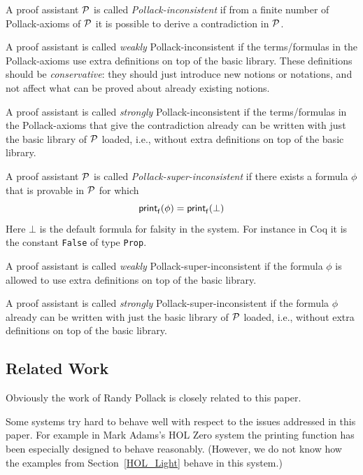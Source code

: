 \documentclass{entcs}
\begin{document}
\begin{definition}
A proof assistant ${\cal P}$ is called \emph{Pollack-inconsistent} if from
a finite number of Pollack-axioms of ${\cal P}$ it is possible
to derive a contradiction in ${\cal P}$.

A proof assistant is called \emph{weakly} Pollack-inconsistent if
the terms/formulas in the Pollack-axioms
use extra definitions on top of the basic library.
These definitions should be \emph{conservative}: they should
just introduce new notions or notations, and not affect what can be proved
about already existing notions.

A proof assistant is called \emph{strongly} Pollack-inconsistent if
the terms/for\-mu\-las in the Pollack-axioms that give the contradiction
already can be written with just the basic library of ${\cal P}$ loaded,
i.e., without extra definitions on top of the basic library.
\end{definition}

\begin{definition}
A proof assistant ${\cal P}$ is called \emph{Pollack-super-inconsistent} if
there exists a formula $\phi$ that is provable in ${\cal P}$ for which
$${\sf print}_{\sf f}(\phi) = {\sf print}_{\sf f}(\bot)$$
Here $\bot$ is the default formula for falsity in the system.
For instance in Coq it is the constant \texttt{False} of type \texttt{Prop}.

A proof assistant is called \emph{weakly} Pollack-super-inconsistent if
the formula $\phi$
is allowed to use extra definitions on top of the basic library.

A proof assistant is called \emph{strongly} Pollack-super-inconsistent if
the formula $\phi$
already can be written with just the basic library of ${\cal P}$ loaded,
i.e., without extra definitions on top of the basic library.
\end{definition}

\subsection{Related Work}

Obviously the work of Randy Pollack is closely related to this paper.

Some systems try hard to behave well with respect to the issues addressed
in this paper.
For example
in Mark Adams's {\small HOL} Zero system the printing function
has been especially designed to behave reasonably.
(However, we do not know how the examples from Section~\ref{HOL_Light}
behave in this system.)
\end{document}
